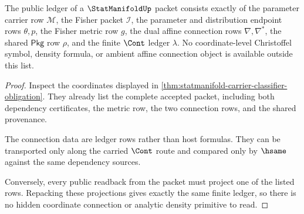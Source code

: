 \begin{theorem}
\label{thm:statmanifold-ledger-exactness}
The public ledger of a $\StatManifoldUp$ packet consists exactly of the
parameter carrier row $\mathcal{M}$, the Fisher packet $\mathcal{I}$, the
parameter and distribution endpoint rows $\theta,p$, the Fisher metric row
$g$, the dual affine connection rows $\nabla,\nabla^\ast$, the shared
$\mathsf{Pkg}$ row $\rho$, and the finite $\Cont$ ledger $\lambda$. No
coordinate-level Christoffel symbol, density formula, or ambient affine
connection object is available outside this list.
\end{theorem}
\begin{proof}
Inspect the coordinates displayed in
\autoref{thm:statmanifold-carrier-classifier-obligation}. They already list
the complete accepted packet, including both dependency certificates, the
metric row, the two connection rows, and the shared provenance.

The connection data are ledger rows rather than host formulas. They can be
transported only along the carried $\Cont$ route and compared only by
$\hsame$ against the same dependency sources.

Conversely, every public readback from the packet must project one of the
listed rows. Repacking these projections gives exactly the same finite ledger,
so there is no hidden coordinate connection or analytic density primitive to
read.
\end{proof}

